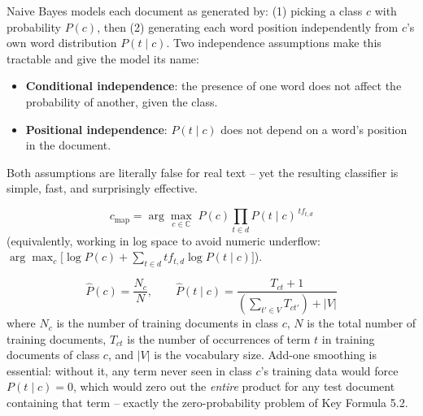 \documentclass[11pt, a4paper]{article}
\begin{document}
\begin{defbox}
Naive Bayes models each document as generated by: (1) picking a class $c$ with probability $P(c)$, then (2) generating each word position independently from $c$'s own word distribution $P(t\mid c)$. Two independence assumptions make this tractable and give the model its name:
\begin{itemize}
  \item \textbf{Conditional independence}: the presence of one word does not affect the probability of another, given the class.
  \item \textbf{Positional independence}: $P(t\mid c)$ does not depend on a word's position in the document.
\end{itemize}
Both assumptions are literally false for real text -- yet the resulting classifier is simple, fast, and surprisingly effective.
\end{defbox}

\begin{formulabox}
\[
c_{\text{map}} = \arg\max_{c \in \mathbb{C}} \; P(c) \prod_{t \in d} P(t\mid c)^{\,tf_{t,d}}
\]
(equivalently, working in log space to avoid numeric underflow: $\arg\max_c \big[\log P(c) + \sum_{t\in d} tf_{t,d}\log P(t\mid c)\big]$).
\end{formulabox}

\begin{formulabox}
\[
\hat P(c) = \frac{N_c}{N}, \qquad
\hat P(t\mid c) = \frac{T_{ct}+1}{\left(\sum_{t'\in V} T_{ct'}\right) + |V|}
\]
where $N_c$ is the number of training documents in class $c$, $N$ is the total number of training documents, $T_{ct}$ is the number of occurrences of term $t$ in training documents of class $c$, and $|V|$ is the vocabulary size. Add-one smoothing is essential: without it, any term never seen in class $c$'s training data would force $P(t\mid c)=0$, which would zero out the \emph{entire} product for any test document containing that term -- exactly the zero-probability problem of Key Formula 5.2.
\end{formulabox}
\end{document}
